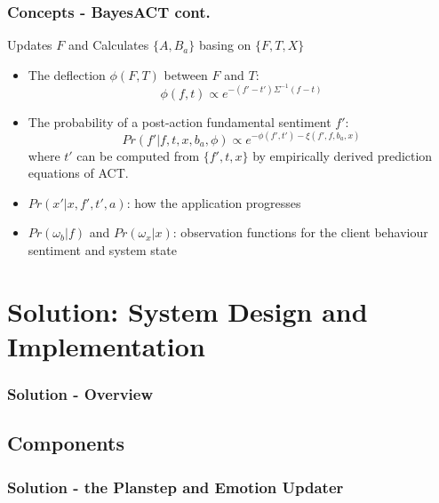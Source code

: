 \documentclass{beamer}
\begin{document}
\begin{frame}
\frametitle{Concepts - BayesACT cont.}
Updates $F$ and Calculates $\{A, B_{a}\}$ basing on $\{F, T, X\}$
\begin{itemize}
\pause \item The deflection $\phi(F, T)$ between $F$ and $T$: 
\begin{equation}\label{eq:eq_deflection}
\phi(f,t) \propto e^{-(f'-t')\Sigma^{-1}(f-t)}
\end{equation}
\pause \item The probability of a post-action fundamental sentiment $f'$:
\begin{equation}\label{eq:eq_pr_f}
Pr(f'|f,t,x,b_{a},\phi) \propto e^{-\phi(f',t')-\xi(f',f,b_{a},x)} 
\end{equation}
where $t'$ can be computed from $\{f', t, x\}$ by empirically derived prediction equations of ACT.
\pause \item $Pr(x'|x,f',t',a)$: how the application progresses
\pause \item $Pr(\omega_{b}|f)$ and $Pr(\omega_{x}|x)$: observation functions for the client behaviour sentiment and system state 
\end{itemize}
\end{frame}

\section{Solution: System Design and Implementation}
\begin{frame}
\frametitle{Solution - Overview}
\end{frame}

\subsection{Components}
\begin{frame}
\frametitle{Solution - the Planstep and Emotion Updater}
\end{frame}
\end{document}
